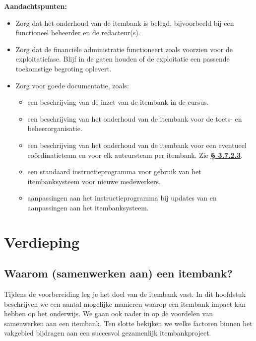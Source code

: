 \documentclass[
]{book}
\providecommand{\tightlist}{%
  \setlength{\itemsep}{0pt}\setlength{\parskip}{0pt}}
\begin{document}
\textbf{Aandachtspunten:}

\begin{itemize}
\tightlist
\item
  Zorg dat het onderhoud van de itembank is belegd, bijvoorbeeld bij een functioneel beheerder en de redacteur(s).
\item
  Zorg dat de financiële administratie functioneert zoals voorzien voor de exploitatiefase. Blijf in de gaten houden of de exploitatie een passende toekomstige begroting oplevert.
\item
  Zorg voor goede documentatie, zoals:

  \begin{itemize}
  \tightlist
  \item
    een beschrijving van de inzet van de itembank in de cursus.
  \item
    een beschrijving van het onderhoud van de itembank voor de toets- en beheerorganisatie.
  \item
    een beschrijving van het onderhoud van de itembank voor een eventueel coördinatieteam en voor elk auteursteam per itembank. Zie \textbf{\protect\hyperlink{itembankonderhoud-en-beheer}{§ 3.7.2.3}}.
  \item
    een standaard instructieprogramma voor gebruik van het itembanksysteem voor nieuwe medewerkers.
  \item
    aanpassingen aan het instructieprogramma bij updates van en aanpassingen aan het itembanksysteem.
  \end{itemize}
\end{itemize}

\hypertarget{verdieping}{%
\chapter{Verdieping}\label{verdieping}}

\hypertarget{waarom-samenwerken-aan-een-itembank}{%
\section{Waarom (samenwerken aan) een itembank?}\label{waarom-samenwerken-aan-een-itembank}}

Tijdens de voorbereiding leg je het doel van de itembank vast. In dit hoofdstuk beschrijven we een aantal mogelijke manieren waarop een itembank impact kan hebben op het onderwijs. We gaan ook nader in op de voordelen van samenwerken aan een itembank. Ten slotte bekijken we welke factoren binnen het vakgebied bijdragen aan een succesvol gezamenlijk itembankproject.
\end{document}
